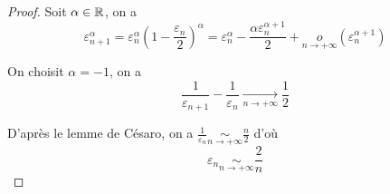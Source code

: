 \documentclass[12pt]{article}
\begin{document}
\begin{proof}
    Soit $\alpha\in\mathbb{R}$, on a 
    \begin{equation}
        \varepsilon_{n+1}^{\alpha}=\varepsilon_{n}^{\alpha}\left(1-\frac{\varepsilon_{n}}{2}\right)^{\alpha}=\varepsilon_{n}^{\alpha}-\frac{\alpha\varepsilon_{n}^{\alpha+1}}{2}+\underset{n\to+\infty}{o}\left(\varepsilon_{n}^{\alpha+1}\right)
    \end{equation}

    On choisit $\alpha=-1$, on a
    \begin{equation}
        \frac{1}{\varepsilon_{n+1}}-\frac{1}{\varepsilon_{n}}\xrightarrow[n\to+\infty]{}\frac{1}{2}
    \end{equation}

    D'après le lemme de Césaro, on a $\frac{1}{\varepsilon_{n}}\underset{n\to+\infty}{\sim}\frac{n}{2}$ d'où 
    \begin{equation}
        \boxed{\varepsilon_{n}\underset{n\to+\infty}{\sim}\frac{2}{n}}
    \end{equation}
\end{proof}
\end{document}
